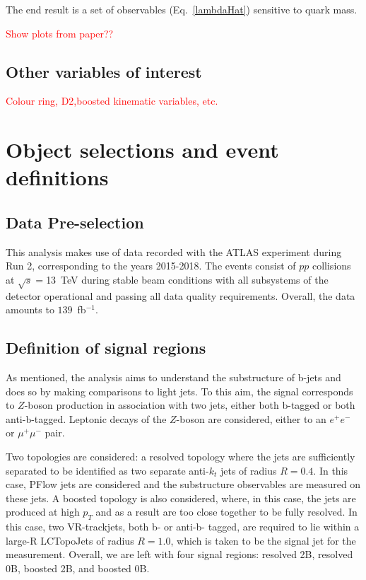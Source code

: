 \documentclass[10pt,a4paper]{book}
\begin{document}
The end result is a set of observables (Eq.~\ref{lambdaHat}) sensitive to quark mass. 

\textcolor{red}{Show plots from paper??}

\subsection{Other variables of interest}
\textcolor{red}{Colour ring, D2,boosted kinematic variables, etc.}

\section{Object selections and event definitions}

\subsection{Data Pre-selection}

This analysis makes use of data recorded with the ATLAS experiment during Run 2, corresponding to the years 2015-2018. The events consist of $pp$ collisions at $\sqrt{s} = $13~TeV during stable beam conditions with all subsystems of the detector operational and passing all data quality requirements. Overall, the data amounts to $139$~fb$^{-1}$. 

\subsection{Definition of signal regions}

As mentioned, the analysis aims to understand the substructure of b-jets and does so by making comparisons to light jets. To this aim, the signal corresponds to $Z$-boson production in association with two jets, either both b-tagged or both anti-b-tagged. Leptonic decays of the $Z$-boson are considered, either to an $e^+e^-$ or $\mu^+\mu^-$ pair. 

Two topologies are considered: a resolved topology where the jets are sufficiently separated to be identified as two separate anti-$k_t$ jets of radius $R = 0.4$. In this case, PFlow jets are considered and the substructure observables are measured on these jets. A boosted topology is also considered, where, in this case, the jets are produced at high $p_T$ and as a result are too close together to be fully resolved. In this case, two VR-trackjets, both b- or anti-b- tagged, are required to lie within a large-R LCTopoJets of radius $R = 1.0$, which is taken to be the signal jet for the measurement. Overall, we are left with four signal regions: resolved 2B, resolved 0B, boosted 2B, and boosted 0B.
\end{document}
